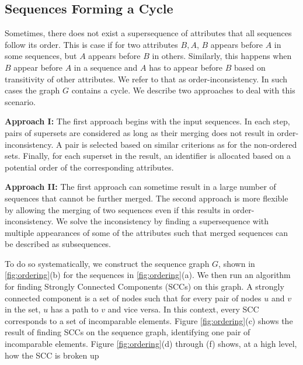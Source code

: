 \subsection{Sequences Forming a Cycle}
Sometimes, there does not exist a supersequence of attributes that all sequences follow its order. This is case  if for two attributes $B, A$,  $B$ appears before $A$ in some sequences, but $A$ appears before $B$ in others. Similarly, this happens when $B$ appear before $A$ in a sequence and $A$ has to appear before $B$ based on transitivity of other attributes. We refer to that as order-inconsistency.  In such cases the graph $G$ contains a cycle. We describe two approaches to deal with this scenario. 

\textbf{Approach I:} The first approach begins with the input sequences. In each step, pairs of supersets are considered as long as their merging does not result in order-inconsistency. A pair is selected based on similar criterions as for the non-ordered sets. Finally, for each superset in the result, an identifier is allocated based on a potential order of the corresponding attributes.

\textbf{Approach II:} The first approach can sometime result in a large number of sequences that cannot be further merged. The second approach is more flexible by allowing the merging of two sequences even if this results in order-inconsistency. We solve the inconsistency by finding a supersequence with multiple appearances of some of the attributes such that merged sequences can be described as subsequences. 

To do so systematically, we construct the sequence graph $G$, shown in \ref{fig:ordering}(b) for the sequences  in \ref{fig:ordering}(a). We then run an algorithm for finding Strongly Connected Components (SCCs) on this graph. A strongly connected component is a set of nodes such that for every pair of nodes $u$ and $v$ in the set, $u$ has a path to $v$ and vice versa. In this context, every SCC corresponds to a set of incomparable elements.  Figure \ref{fig:ordering}(c) shows the result of finding SCCs on the sequence graph, identifying one pair of incomparable elements. Figure \ref{fig:ordering}(d) through (f) shows, at a high level, how the SCC is broken up 


